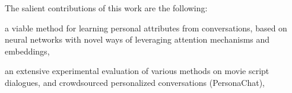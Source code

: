 The salient contributions of this work are the following: 
\squishlist
\item a viable method for learning personal attributes from
conversations, based on neural networks with novel ways of
leveraging attention mechanisms and embeddings,
\item an extensive experimental evaluation of various methods on
movie script dialogues, and crowdsourced personalized conversations (PersonaChat),
\item {}
\squishend

